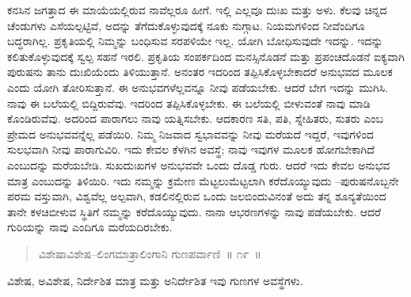 ಕನಸಿನ ಜಗತ್ತಾದ ಈ ಮಾಯೆಯಲ್ಲಿರುವ ನಾವೆಲ್ಲರೂ ಹೀಗೆ. ಇಲ್ಲಿ ಎಲ್ಲವೂ ದುಃಖ ಮತ್ತು ಅಳು. ಕೆಲವು ಚಿನ್ನದ ಚೆಂಡುಗಳು ಎಸೆಯಲ್ಪಟ್ಟಿವೆ, ಅದನ್ನು ತೆಗೆದುಕೊಳ್ಳುವುದಕ್ಕೆ ನೂಕು ನುಗ್ಗಾಟ. ನಿಯಮಗಳಿಂದ ನೀವೆಂದಿಗೂ ಬದ್ಧರಾಗಿಲ್ಲ. ಪ್ರಕೃತಿಯಲ್ಲಿ ನಿಮ್ಮನ್ನು ಬಂಧಿಸುವ ಸರಪಳಿಯೇ ಇಲ್ಲ. ಯೋಗಿ ಬೋಧಿಸುವುದೇ ಇದನ್ನು. ಇದನ್ನು ಕಲಿತುಕೊಳ್ಳುವುದಕ್ಕೆ ಸ್ವಲ್ಪ ಸಹನೆ ಇರಲಿ. ಪ್ರಕೃತಿಯ ಸಂಪರ್ಕದಿಂದ ಮನಸ್ಸಿನೊಡನೆ ಮತ್ತು ಪ್ರಪಂಚದೊಡನೆ ಐಕ್ಯವಾಗಿ ಪುರುಷನು ತಾನು ದುಃಖಿಯೆಂದು ತಿಳಿಯುತ್ತಾನೆ. ಅನಂತರ ಇದರಿಂದ ತಪ್ಪಿಸಿಕೊಳ್ಳಬೇಕಾದರೆ ಅನುಭವದ ಮೂಲಕ ಎಂದು ಯೋಗಿ ತೋರಿಸುತ್ತಾನೆ. ಈ ಅನುಭವಗಳೆಲ್ಲವನ್ನೂ ನೀವು ಪಡೆಯಬೇಕು. ಆದರೆ ಬೇಗ ಇದನ್ನು ಮುಗಿಸಿ. ನಾವು ಈ ಬಲೆಯಲ್ಲಿ ಬಿದ್ದಿರುವೆವು. ಇದರಿಂದ ತಪ್ಪಿಸಿಕೊಳ್ಳಬೇಕು. ಈ ಬಲೆಯಲ್ಲಿ ಬೀಳುವಂತೆ ನಾವು ಮಾಡಿ ಕೊಂಡಿರುವೆವು. ಅದರಿಂದ ಪಾರಾಗಲು ನಾವು ಯತ್ನಿಸಬೇಕು. ಆದಕಾರಣ ಸತಿ, ಪತಿ, ಸ್ನೇಹಿತರು, ಸುತರು ಎಂಬ ಪ್ರೇಮದ ಅನುಭವವನ್ನೆಲ್ಲ ಪಡೆಯಿರಿ. ನಿಮ್ಮ ನಿಜವಾದ ಸ್ವಭಾವವನ್ನು ನೀವು ಮರೆಯದೆ ಇದ್ದರೆ, ಇವುಗಳಿಂದ ಸುಲಭವಾಗಿ ನೀವು ಪಾರಾಗುವಿರಿ. ಇದು ಕೇವಲ ಕೆಳಗಿನ ಅವಸ್ಥೆ; ನಾವು ಇವುಗಳ ಮೂಲಕ ಹೋಗಬೇಕಾಗಿದೆ ಎಂಬುದನ್ನು ಮರೆಯಬೇಡಿ. ಸುಖದುಃಖಗಳ ಅನುಭವವೇ ಒಂದು ದೊಡ್ಡ ಗುರು. ಆದರೆ ಇದು ಕೇವಲ ಅನುಭವ ಮಾತ್ರ ಎಂಬುದನ್ನು ತಿಳಿಯಿರಿ. ಇದು ನಮ್ಮನ್ನು ಕ್ರಮೇಣ ಮೆಟ್ಟಲುಮೆಟ್ಟಲಾಗಿ ಕರೆದೊಯ್ಯುವುದು –ಪುರುಷನೊಬ್ಬನೇ ಪರಮ ವಸ್ತುವಾಗಿ, ವಿಶ್ವವೆಲ್ಲ ಅಲ್ಪವಾಗಿ, ಕಡಲಿನಲ್ಲಿರುವ ಒಂದು ಜಲಬಿಂದುವಿನಂತೆ ಅದು ತನ್ನ ಶೂನ್ಯತೆಯಿಂದ ತಾನೇ ಕಳಚಿಬೀಳುವ ಸ್ಥಿತಿಗೆ ನಮ್ಮನ್ನು ಕರೆದೊಯ್ಯುವುದು. ನಾನಾ ಆಭರಣಗಳನ್ನು ನಾವು ಪಡೆಯಬೇಕು. ಆದರೆ ಗುರಿಯನ್ನು ನಾವು ಎಂದಿಗೂ ಮರೆಯದಿರಬೇಕು. 


\begin{verse}
ವಿಶೇಷಾವಿಶೇಷ–ಲಿಂಗಮಾತ್ರಾಲಿಂಗಾನಿ ಗುಣಪರ್ವಾಣಿ~॥ ೧೯~॥
\end{verse}


ವಿಶೇಷ, ಅವಿಶೇಷ, ನಿರ್ದೇಶಿತ ಮಾತ್ರ ಮತ್ತು ಅನಿರ್ದೇಶಿತ ಇವು ಗುಣಗಳ ಅವಸ್ಥೆಗಳು. 

